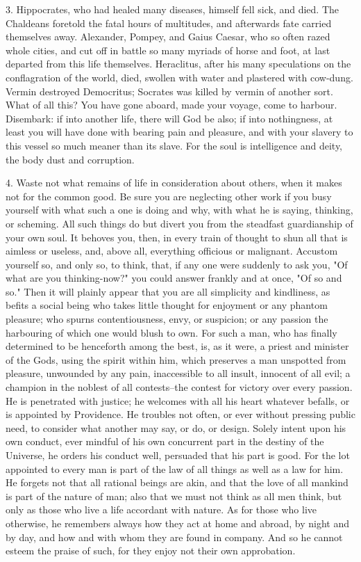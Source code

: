 \documentclass{book}
\begin{document}
3. Hippocrates, who had healed many diseases, himself fell sick, and
died. The Chaldeans foretold the fatal hours of multitudes, and
afterwards fate carried themselves away. Alexander, Pompey, and Gaius
Caesar, who so often razed whole cities, and cut off in battle so many
myriads of horse and foot, at last departed from this life
themselves. Heraclitus, after his many speculations on the
conflagration of the world, died, swollen with water and plastered
with cow-dung. Vermin destroyed Democritus; Socrates was killed by
vermin of another sort. What of all this? You have gone aboard, made
your voyage, come to harbour. Disembark: if into another life, there
will God be also; if into nothingness, at least you will have done
with bearing pain and pleasure, and with your slavery to this vessel
so much meaner than its slave. For the soul is intelligence and deity,
the body dust and corruption.

4. Waste not what remains of life in consideration about others, when
it makes not for the common good. Be sure you are neglecting other
work if you busy yourself with what such a one is doing and why, with
what he is saying, thinking, or scheming. All such things do but
divert you from the steadfast guardianship of your own soul. It
behoves you, then, in every train of thought to shun all that is
aimless or useless, and, above all, everything officious or
malignant. Accustom yourself so, and only so, to think, that, if any
one were suddenly to ask you, "Of what are you thinking-now?" you
could answer frankly and at once, "Of so and so." Then it will plainly
appear that you are all simplicity and kindliness, as befits a social
being who takes little thought for enjoyment or any phantom pleasure;
who spurns contentiousness, envy, or suspicion; or any passion the
harbouring of which one would blush to own. For such a man, who has
finally determined to be henceforth among the best, is, as it were, a
priest and minister of the Gods, using the spirit within him, which
preserves a man unspotted from pleasure, unwounded by any pain,
inaccessible to all insult, innocent of all evil; a champion in the
noblest of all contests--the contest for victory over every
passion. He is penetrated with justice; he welcomes with all his heart
whatever befalls, or is appointed by Providence. He troubles not
often, or ever without pressing public need, to consider what another
may say, or do, or design. Solely intent upon his own conduct, ever
mindful of his own concurrent part in the destiny of the Universe, he
orders his conduct well, persuaded that his part is good. For the lot
appointed to every man is part of the law of all things as well as a
law for him. He forgets not that all rational beings are akin, and
that the love of all mankind is part of the nature of man; also that
we must not think as all men think, but only as those who live a life
accordant with nature. As for those who live otherwise, he remembers
always how they act at home and abroad, by night and by day, and how
and with whom they are found in company. And so he cannot esteem the
praise of such, for they enjoy not their own approbation.
\end{document}
